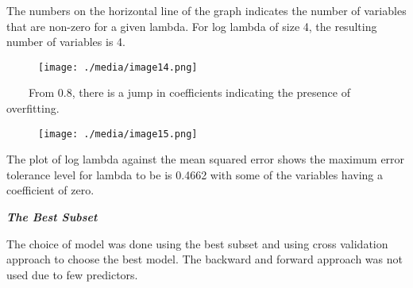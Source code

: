 \documentclass[12pt]{article}
\begin{document}

\par

The numbers on the horizontal line of the graph indicates the number of variables that are non-zero for a given lambda. For log lambda of size 4, the resulting number of variables is 4.\par




\begin{figure}[H]
	\begin{Center}
		\texttt{[image: ./media/image14.png]}
	\end{Center}
\end{figure}



\par


\vspace{\baselineskip}
\ \ \ \  From 0.8, there is a jump in coefficients indicating the presence of overfitting.\par




\begin{figure}[H]
	\begin{Center}
		\texttt{[image: ./media/image15.png]}
	\end{Center}
\end{figure}



\par

The plot of log lambda against the mean squared error shows the maximum error tolerance level for lambda to be is 0.4662 with some of the variables having a coefficient of zero.\par

\textbf{\textit{The Best Subset}}\par

\begin{justify}
The choice of model was done using the best subset and using cross validation approach to choose the best model. The backward and forward approach was not used due to few predictors. 
\end{justify}\par
\end{document}
